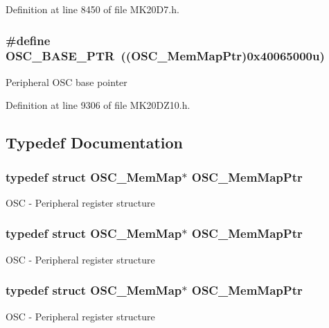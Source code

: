 Definition at line 8450 of file M\+K20\+D7.\+h.

\subsubsection[{\texorpdfstring{O\+S\+C\+\_\+\+B\+A\+S\+E\+\_\+\+P\+TR}{OSC_BASE_PTR}}]{\setlength{\rightskip}{0pt plus 5cm}\#define O\+S\+C\+\_\+\+B\+A\+S\+E\+\_\+\+P\+TR~(({\bf O\+S\+C\+\_\+\+Mem\+Map\+Ptr})0x40065000u)}\hypertarget{group___o_s_c___peripheral_gaf1086ccc399b36fe95a52c677e9936ac}{}\label{group___o_s_c___peripheral_gaf1086ccc399b36fe95a52c677e9936ac}
Peripheral O\+SC base pointer 

Definition at line 9306 of file M\+K20\+D\+Z10.\+h.



\subsection{Typedef Documentation}
\subsubsection[{\texorpdfstring{O\+S\+C\+\_\+\+Mem\+Map\+Ptr}{OSC_MemMapPtr}}]{\setlength{\rightskip}{0pt plus 5cm}typedef struct {\bf O\+S\+C\+\_\+\+Mem\+Map}$\ast$ {\bf O\+S\+C\+\_\+\+Mem\+Map\+Ptr}}\hypertarget{group___o_s_c___peripheral_gaaa685163f549fdf24c28ec9b400310b5}{}\label{group___o_s_c___peripheral_gaaa685163f549fdf24c28ec9b400310b5}
O\+SC -\/ Peripheral register structure 
\subsubsection[{\texorpdfstring{O\+S\+C\+\_\+\+Mem\+Map\+Ptr}{OSC_MemMapPtr}}]{\setlength{\rightskip}{0pt plus 5cm}typedef struct {\bf O\+S\+C\+\_\+\+Mem\+Map}$\ast$ {\bf O\+S\+C\+\_\+\+Mem\+Map\+Ptr}}\hypertarget{group___o_s_c___peripheral_gaaa685163f549fdf24c28ec9b400310b5}{}\label{group___o_s_c___peripheral_gaaa685163f549fdf24c28ec9b400310b5}
O\+SC -\/ Peripheral register structure 
\subsubsection[{\texorpdfstring{O\+S\+C\+\_\+\+Mem\+Map\+Ptr}{OSC_MemMapPtr}}]{\setlength{\rightskip}{0pt plus 5cm}typedef struct {\bf O\+S\+C\+\_\+\+Mem\+Map}$\ast$ {\bf O\+S\+C\+\_\+\+Mem\+Map\+Ptr}}\hypertarget{group___o_s_c___peripheral_gaaa685163f549fdf24c28ec9b400310b5}{}\label{group___o_s_c___peripheral_gaaa685163f549fdf24c28ec9b400310b5}
O\+SC -\/ Peripheral register structure 